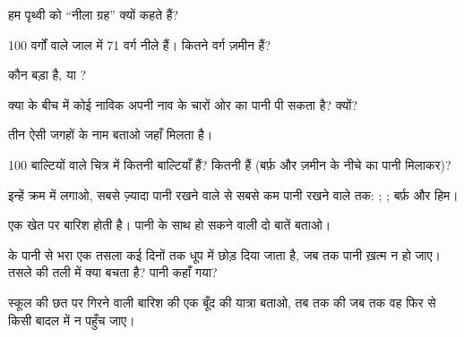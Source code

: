 \begin{exercise}[$\star$]\label{exo:g2:water-on-earth:2}
हम पृथ्वी को ``नीला ग्रह'' क्यों कहते हैं?
\end{exercise}

\begin{exercise}[$\star$]\label{exo:g2:water-on-earth:3}
100 वर्गों वाले जाल में 71 वर्ग नीले हैं। कितने वर्ग ज़मीन हैं?
\end{exercise}

\begin{exercise}[$\star$]\label{exo:g2:water-on-earth:4}
कौन बड़ा है,  या ?
\end{exercise}

\begin{exercise}[$\star$]\label{exo:g2:water-on-earth:5}
क्या  के बीच में कोई नाविक अपनी नाव के चारों ओर का पानी पी सकता है?
क्यों?
\end{exercise}

\begin{exercise}[$\star$]\label{exo:g2:water-on-earth:6}
तीन ऐसी जगहों के नाम बताओ जहाँ  मिलता है।
\end{exercise}

\begin{exercise}[$\star\star$]\label{exo:g2:water-on-earth:7}
100 बाल्टियों वाले चित्र में कितनी बाल्टियाँ  हैं? कितनी  हैं (बर्फ़ और ज़मीन के नीचे का पानी मिलाकर)?
\end{exercise}

\begin{exercise}[$\star\star$]\label{exo:g2:water-on-earth:8}
इन्हें क्रम में लगाओ, सबसे ज़्यादा पानी रखने वाले से सबसे कम पानी रखने वाले
तक: ; ; बर्फ़ और हिम।
\end{exercise}

\begin{exercise}[$\star\star$]\label{exo:g2:water-on-earth:9}
एक खेत पर बारिश होती है। पानी के साथ हो सकने वाली दो बातें बताओ।
\end{exercise}

\begin{exercise}[$\star\star$]\label{exo:g2:water-on-earth:10}
 के पानी से भरा एक तसला कई दिनों तक धूप में छोड़ दिया जाता है, जब
तक पानी ख़त्म न हो जाए। तसले की तली में क्या बचता है? पानी कहाँ गया?
\end{exercise}

\begin{exercise}[$\star\star$]\label{exo:g2:water-on-earth:11}
स्कूल की छत पर गिरने वाली बारिश की एक बूँद की यात्रा बताओ, तब तक की जब
तक वह फिर से किसी बादल में न पहुँच जाए।
\end{exercise}
